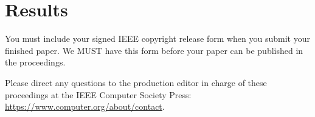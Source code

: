 \section{Results}

You must include your signed IEEE copyright release form when you submit your finished paper.
We MUST have this form before your paper can be published in the proceedings.

Please direct any questions to the production editor in charge of these proceedings at the IEEE Computer Society Press:
\url{https://www.computer.org/about/contact}.